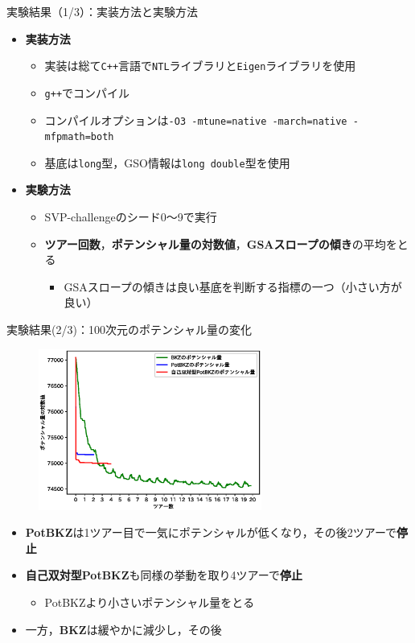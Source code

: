 \documentclass[12pt,aspectratio=169,xcolor=dvipsnames,table,dvipdfmx, leqno]{beamer}
\begin{document}
\begin{frame}{実験結果（1/3）：実装方法と実験方法}
\begin{itemize}
    \item \textbf{実装方法}
    \begin{itemize}
        \item 実装は総て\texttt{C++}言語で\texttt{NTL}ライブラリ\cite{NTL}と\texttt{Eigen}ライブラリ\cite{Eigen}を使用
        \item \texttt{g++}でコンパイル
        \item コンパイルオプションは\texttt{-O3 -mtune=native -march=native -mfpmath=both}
        \item 基底は\texttt{long}型，GSO情報は\texttt{long double}型を使用
    \end{itemize}
    \item \textbf{実験方法}
    \begin{itemize}
        \item SVP-challenge\cite{SVP}のシード0～9で実行
        \item \textbf{ツアー回数}，\textbf{ポテンシャル量の対数値}，\textbf{GSAスロープの傾き}の平均をとる
        \begin{itemize}
            \item GSAスロープの傾きは良い基底を判断する指標の一つ（小さい方が良い）
        \end{itemize}
    \end{itemize}
\end{itemize}
\end{frame}

\begin{frame}{実験結果(2/3)：100次元のポテンシャル量の変化}
\begin{figure}[t]
\includegraphics[height = 150pt]{100_compare_potential.eps}
\end{figure}
\begin{itemize}
    \footnotesize
    \item \textbf{PotBKZ}は1ツアー目で一気にポテンシャルが低くなり，その後\alert{2ツアーで\textbf{停止}}
    \item \textbf{自己双対型PotBKZ}も同様の挙動を取り\alert{4ツアーで\textbf{停止}}
    \begin{itemize}
        \item PotBKZより\alert{小さいポテンシャル量をとる}
    \end{itemize}
    \item 一方，\textbf{BKZ}\cite{SE94}は緩やかに減少し，その後
\end{itemize}
\end{frame}
\end{document}
